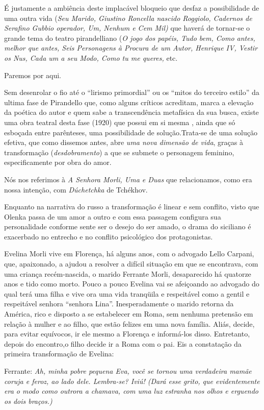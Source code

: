 É justamente a ambiência deste implacável bloqueio que desfaz a
possibilidade de uma outra vida (\emph{Seu Marido, Giustino Roncella
nascido Roggiolo, Cadernos de Serafino Gubbio operador, Um, Nenhum e Cem
Mil)} que haverá de tornar-se o grande tema do teatro pirandelliano
(\emph{O jogo dos papéis, Tudo bem, Como antes, melhor que antes, Seis
Personagens à Procura de um Autor, Henrique IV, Vestir os Nus, Cada um a
seu Modo, Como tu me queres,} etc.

Paremos por aqui.

Sem desenrolar o fio até o ``lirismo primordial'' ou os ``mitos do
terceiro estilo'' da ultima fase de Pirandello que, como alguns críticos
acreditam, marca a elevação da poética do autor e quem sabe a
transcendência metafísica da sua busca, existe uma obra teatral desta
fase (1920) que possui em si mesma , ainda que só esboçada entre
parênteses, uma possibilidade de solução.Trata-se de uma solução
efetiva, que como dissemos antes, abre \emph{uma nova dimensão de vida},
graças à transformação (\emph{desdobramento}) a que se submete o
personagem feminino, especificamente por obra do amor.

Nós nos referimos à \emph{A Senhora Morli, Uma e Duas} que relacionamos,
como era nossa intenção, com \emph{Dúchetchka} de Tchékhov.

Enquanto na narrativa do russo a transformação é linear e sem conflito,
visto que Olenka passa de um amor a outro e com essa passagem configura
sua personalidade conforme sente ser o desejo do ser amado, o drama do
siciliano é exacerbado no entrecho e no conflito psicológico dos
protagonistas.

Evelina Morli vive em Florença, há alguns anos, com o advogado Lello
Carpani, que, apaixonado, a ajudou a resolver a difícil situação em que
se encontrava, com uma criança recém-nascida, o marido Ferrante Morli,
desaparecido há quatorze anos e tido como morto. Pouco a pouco Evelina
vai se afeiçoando ao advogado do qual terá uma filha e vive ora uma vida
tranqüila e respeitável como a gentil e respeitável senhora ``senhora
Lina''. Inesperadamente o marido retorna da América, rico e disposto a
se estabelecer em Roma, sem nenhuma pretensão em relação à mulher e ao
filho, que estão felizes em uma nova família. Aliás, decide, para evitar
equívocos, ir ele mesmo a Florença e informá-los disso. Entretanto,
depois do encontro,o filho decide ir a Roma com o pai. Eis a constatação
da primeira transformação de Evelina:

Ferrante: \emph{Ah, minha pobre pequena Eva, você se tornou uma
verdadeira mamãe coruja e feroz, ao lado dele. Lembra-se? Iviú! (Dará
esse grito, que evidentemente era o modo como outrora a chamava, com uma
luz estranha nos olhos e erguendo os dois braços.)}

